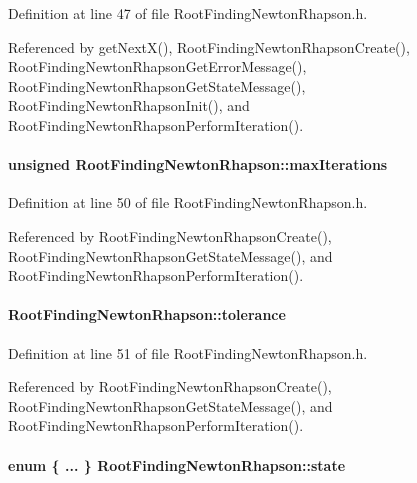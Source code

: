 Definition at line 47 of file RootFindingNewtonRhapson.h.

Referenced by getNextX(), RootFindingNewtonRhapsonCreate(), RootFindingNewtonRhapsonGetErrorMessage(), RootFindingNewtonRhapsonGetStateMessage(), RootFindingNewtonRhapsonInit(), and RootFindingNewtonRhapsonPerformIteration().\hypertarget{structRootFindingNewtonRhapson_931d9fbff24e1dd9535e3060470a9873}{
\paragraph[maxIterations]{\setlength{\rightskip}{0pt plus 5cm}unsigned {\bf RootFindingNewtonRhapson::maxIterations}}\hfill}
\label{structRootFindingNewtonRhapson_931d9fbff24e1dd9535e3060470a9873}




Definition at line 50 of file RootFindingNewtonRhapson.h.

Referenced by RootFindingNewtonRhapsonCreate(), RootFindingNewtonRhapsonGetStateMessage(), and RootFindingNewtonRhapsonPerformIteration().\hypertarget{structRootFindingNewtonRhapson_d08bd3b49a28267b55f91b38fecef4b6}{
\paragraph[tolerance]{ {\bf RootFindingNewtonRhapson::tolerance}}\hfill}
\label{structRootFindingNewtonRhapson_d08bd3b49a28267b55f91b38fecef4b6}




Definition at line 51 of file RootFindingNewtonRhapson.h.

Referenced by RootFindingNewtonRhapsonCreate(), RootFindingNewtonRhapsonGetStateMessage(), and RootFindingNewtonRhapsonPerformIteration().\hypertarget{structRootFindingNewtonRhapson_de6c150e9d8a98e8a097f1002094fc90}{
\paragraph[state]{\setlength{\rightskip}{0pt plus 5cm}enum \{ ... \}   {\bf RootFindingNewtonRhapson::state}}\hfill}
\label{structRootFindingNewtonRhapson_de6c150e9d8a98e8a097f1002094fc90}


